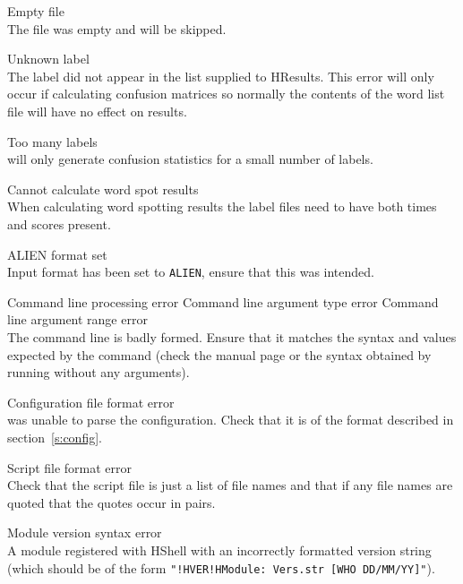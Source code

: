 \begin{itemize}
\begin{itemize}
    Empty file\\
        The file was empty and will be skipped.

    Unknown label\\
        The label did not appear in the list supplied to HResults.
        This error will only occur if calculating confusion matrices so 
        normally the contents of the word list file will have no effect 
        on results.

    Too many labels\\
         will only generate confusion statistics for a small 
        number of labels.

 Cannot calculate word spot results\\
        When calculating word spotting results the label files need to have 
        both times and scores present.

    ALIEN format set\\
        Input format has been set to \texttt{ALIEN}, ensure that this was 
        intended.

\end{itemize}


\begin{itemize}
    Command line processing error
    Command line argument type error
    Command line argument range error\\
        The command line is badly formed.  Ensure that it matches the 
        syntax and values expected by the command (check the manual 
        page or the syntax obtained by running  without any
        arguments).

    Configuration file format error\\
         was unable to parse the configuration. Check that
        it is of the format described in section~\ref{s:config}.

    Script file format error\\
        Check that the script file is just a list of file names and that
        if any file names are quoted that the quotes occur in pairs.

    Module version syntax error\\
        A module registered with HShell with an incorrectly formatted
        version string (which should be of the form
        \texttt{"!HVER!HModule: Vers.str [WHO DD/MM/YY]"}).


\end{itemize}
\end{itemize}
